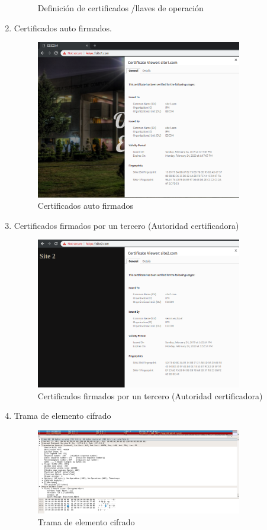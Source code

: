 \begin{enumerate}
\begin{figure}[htbp]
				\caption[Definición de certificados /llaves de operación]{Definición de certificados /llaves de operación}
				\label{fig:8}
			\end{figure}
		\item Certificados auto firmados.
			\begin{figure}[htbp]
				\centering
				\includegraphics[width=9cm]{./img/lista/9.png}
				\caption[Certificados auto firmados]{Certificados auto firmados}
				\label{fig:9}
			\end{figure}
		\item Certificados firmados por un tercero (Autoridad certificadora)
			\begin{figure}[htbp]
				\centering
				\includegraphics[width=9cm]{./img/lista/10.png}
				\caption[Certificados firmados por un tercero (Autoridad certificadora)]{Certificados firmados por un tercero (Autoridad certificadora)}
				\label{fig:10}
			\end{figure}
		\item Trama de elemento cifrado
			\begin{figure}[htbp]
				\centering
				\includegraphics[width=9cm]{./img/lista/11.png}
				\caption[Trama de elemento cifrado]{Trama de elemento cifrado}
				\label{fig:11}
			\end{figure}
	\end{enumerate}

